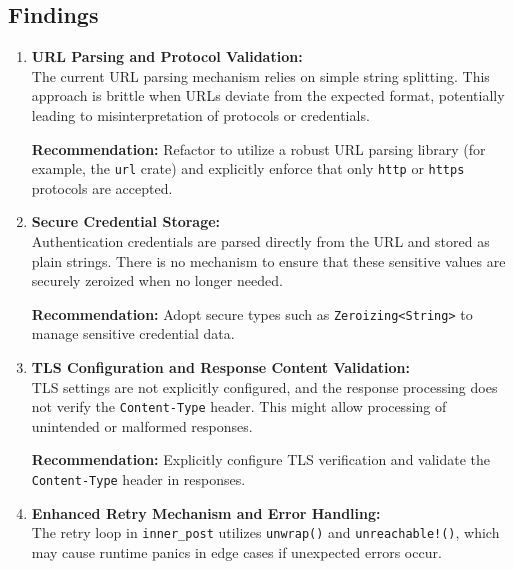 \documentclass[12pt,a4paper]{article}
\begin{document}
\subsection{Findings}

\begin{enumerate}
    \item \textbf{URL Parsing and Protocol Validation:}\\
    The current URL parsing mechanism relies on simple string splitting. This approach is brittle when URLs deviate from the expected format, potentially leading to misinterpretation of protocols or credentials.
    
    \textbf{Recommendation:} Refactor to utilize a robust URL parsing library (for example, the \texttt{url} crate) and explicitly enforce that only \texttt{http} or \texttt{https} protocols are accepted.
    
    \item \textbf{Secure Credential Storage:}\\
    Authentication credentials are parsed directly from the URL and stored as plain strings. There is no mechanism to ensure that these sensitive values are securely zeroized when no longer needed.
    
    \textbf{Recommendation:} Adopt secure types such as \texttt{Zeroizing<String>} to manage sensitive credential data.

    \item \textbf{TLS Configuration and Response Content Validation:}\\
    TLS settings are not explicitly configured, and the response processing does not verify the \texttt{Content-Type} header. This might allow processing of unintended or malformed responses.
    
    \textbf{Recommendation:} Explicitly configure TLS verification and validate the \texttt{Content-Type} header in responses.

    \item \textbf{Enhanced Retry Mechanism and Error Handling:}\\
    The retry loop in \texttt{inner\_post} utilizes \texttt{unwrap()} and \texttt{unreachable!()}, which may cause runtime panics in edge cases if unexpected errors occur.
    

\end{enumerate}
\end{document}
